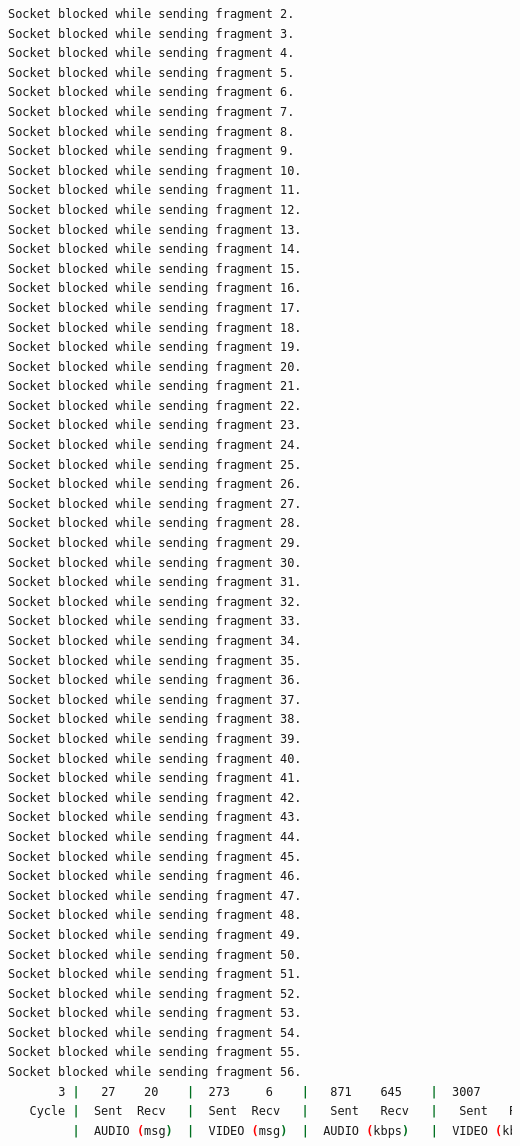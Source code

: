 \begin{lstlisting}[language=bash,basicstyle=\ttfamily\tiny]
Socket blocked while sending fragment 2.
Socket blocked while sending fragment 3.
Socket blocked while sending fragment 4.
Socket blocked while sending fragment 5.
Socket blocked while sending fragment 6.
Socket blocked while sending fragment 7.
Socket blocked while sending fragment 8.
Socket blocked while sending fragment 9.
Socket blocked while sending fragment 10.
Socket blocked while sending fragment 11.
Socket blocked while sending fragment 12.
Socket blocked while sending fragment 13.
Socket blocked while sending fragment 14.
Socket blocked while sending fragment 15.
Socket blocked while sending fragment 16.
Socket blocked while sending fragment 17.
Socket blocked while sending fragment 18.
Socket blocked while sending fragment 19.
Socket blocked while sending fragment 20.
Socket blocked while sending fragment 21.
Socket blocked while sending fragment 22.
Socket blocked while sending fragment 23.
Socket blocked while sending fragment 24.
Socket blocked while sending fragment 25.
Socket blocked while sending fragment 26.
Socket blocked while sending fragment 27.
Socket blocked while sending fragment 28.
Socket blocked while sending fragment 29.
Socket blocked while sending fragment 30.
Socket blocked while sending fragment 31.
Socket blocked while sending fragment 32.
Socket blocked while sending fragment 33.
Socket blocked while sending fragment 34.
Socket blocked while sending fragment 35.
Socket blocked while sending fragment 36.
Socket blocked while sending fragment 37.
Socket blocked while sending fragment 38.
Socket blocked while sending fragment 39.
Socket blocked while sending fragment 40.
Socket blocked while sending fragment 41.
Socket blocked while sending fragment 42.
Socket blocked while sending fragment 43.
Socket blocked while sending fragment 44.
Socket blocked while sending fragment 45.
Socket blocked while sending fragment 46.
Socket blocked while sending fragment 47.
Socket blocked while sending fragment 48.
Socket blocked while sending fragment 49.
Socket blocked while sending fragment 50.
Socket blocked while sending fragment 51.
Socket blocked while sending fragment 52.
Socket blocked while sending fragment 53.
Socket blocked while sending fragment 54.
Socket blocked while sending fragment 55.
Socket blocked while sending fragment 56.
       3 |   27    20    |  273     6    |   871    645    |  3007     63    |  41     72       
   Cycle |  Sent  Recv   |  Sent  Recv   |   Sent   Recv   |   Sent   Recv   | Program System
         |  AUDIO (msg)  |  VIDEO (msg)  |  AUDIO (kbps)   |  VIDEO (kbps)   |     CPU (%) 

\end{lstlisting}
